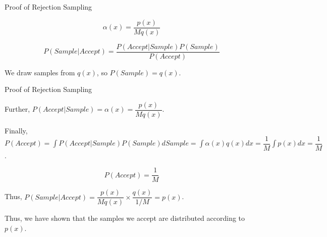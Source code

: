 \documentclass[handout]{beamer}
\begin{document}
    \begin{frame}{Proof of Rejection Sampling}
        \begin{tcolorbox}[colback=metropolisblue!5,colframe=metropolisblue,title={Acceptance Probability $\alpha(x)$}]
            \begin{equation}
              \alpha(x) = \frac{p(x)}{M q(x)}
            \end{equation}
    \end{tcolorbox}
       
    \begin{tcolorbox}[colback=metropolisblue!5,colframe=metropolisblue,title={Bayes Rule for Acceptance}]
        \begin{equation}
            P(Sample|Accept) = \frac{P(Accept|Sample) P(Sample)}{P(Accept)}
        \end{equation}
\end{tcolorbox}

\begin{tcolorbox}[colback=metropolisblue!5,colframe=metropolisblue,title={P(Sample)}]
    We draw samples from $q(x)$, so $P(Sample) = q(x)$.
\end{tcolorbox}
\end{frame}

\begin{frame}{Proof of Rejection Sampling}
    


       
        

        Further, $P(Accept|Sample) = \alpha(x) = \dfrac{p(x)}{M q(x)}$.

        Finally, $P(Accept) = \int P(Accept|Sample) P(Sample) dSample = \int \alpha(x) q(x) dx = \dfrac{1}{M} \int p(x) dx = \dfrac{1}{M}$.
        \begin{tcolorbox}[colback=metropolisblue!5,colframe=metropolisblue,title={P(Accept)}]
            \begin{equation}
                P(Accept) = \frac{1}{M}
            \end{equation}
        \end{tcolorbox}
        

        Thus, $P(Sample|Accept) = \dfrac{p(x)}{M q(x)} \times \dfrac{q(x)}{1/M} = p(x)$.

        Thus, we have shown that the samples we accept are distributed according to $p(x)$.

        
    \end{frame}
\end{document}

